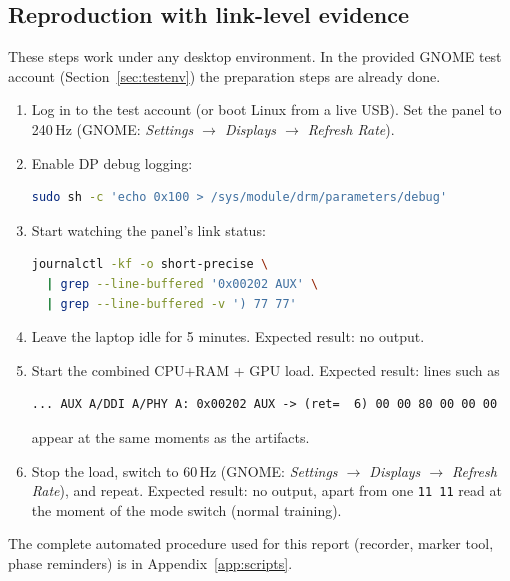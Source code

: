 \documentclass[11pt,a4paper]{article}
\newcommand{\reg}[1]{\texttt{#1}}
\begin{document}
\subsection{Reproduction with link-level evidence}
These steps work under any desktop environment. In the provided GNOME test account (Section~\ref{sec:testenv}) the preparation steps are already done.
\begin{enumerate}
\item Log in to the test account (or boot Linux from a live USB). Set the panel to 240\,Hz (GNOME: \emph{Settings $\to$ Displays $\to$ Refresh Rate}).
\item Enable DP debug logging:
\begin{lstlisting}[language=bash]
sudo sh -c 'echo 0x100 > /sys/module/drm/parameters/debug'
\end{lstlisting}
\item Start watching the panel's link status:
\begin{lstlisting}[language=bash]
journalctl -kf -o short-precise \
  | grep --line-buffered '0x00202 AUX' \
  | grep --line-buffered -v ') 77 77'
\end{lstlisting}
\item Leave the laptop idle for 5 minutes. Expected result: no output.
\item Start the combined CPU+RAM + GPU load. Expected result: lines such as
\begin{lstlisting}
... AUX A/DDI A/PHY A: 0x00202 AUX -> (ret=  6) 00 00 80 00 00 00
\end{lstlisting}
appear at the same moments as the artifacts.
\item Stop the load, switch to 60\,Hz (GNOME: \emph{Settings $\to$ Displays $\to$ Refresh Rate}), and repeat. Expected result: no output, apart from one \reg{11 11} read at the moment of the
mode switch (normal training).
\end{enumerate}
\noindent The complete automated procedure used for this report (recorder, marker tool, phase reminders) is in Appendix~\ref{app:scripts}.

\end{document}
